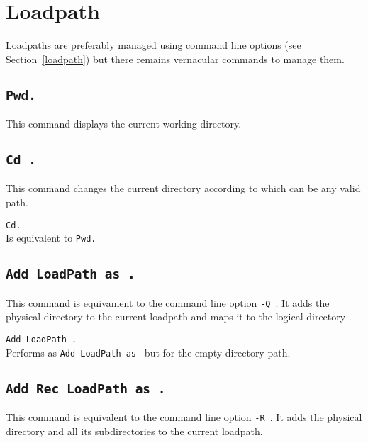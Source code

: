 \section[Loadpath]{Loadpath}

Loadpaths are preferably managed using {\Coq} command line options
(see Section~\ref{loadpath}) but there remains vernacular commands to
manage them.

\subsection[\tt Pwd.]{\tt Pwd.\label{Pwd}}
This command displays the current working directory.

\subsection[\tt Cd {\str}.]{\tt Cd {\str}.}
This command changes the current directory according to {\str} 
which can be any valid path.

\begin{Variants}
\item {\tt Cd.}\\
  Is equivalent to {\tt Pwd.}
\end{Variants}

\subsection[\tt Add LoadPath {\str} as {\dirpath}.]{\tt Add LoadPath {\str} as {\dirpath}.\label{AddLoadPath}}

This command is equivament to the command line option {\tt -Q {\dirpath}
  {\str}}. It adds the physical directory {\str} to the current {\Coq}
loadpath and maps it to the logical directory {\dirpath}.

\begin{Variants}
\item {\tt Add LoadPath {\str}.}\\
Performs as {\tt Add LoadPath {\str} as {\dirpath}} but for the empty directory path.
\end{Variants}

\subsection[\tt Add Rec LoadPath {\str} as {\dirpath}.]{\tt Add Rec LoadPath {\str} as {\dirpath}.\label{AddRecLoadPath}}
This command is equivalent to the command line option {\tt -R {\dirpath}
  {\str}}. It adds the physical directory {\str} and all its
subdirectories to the current {\Coq} loadpath.

